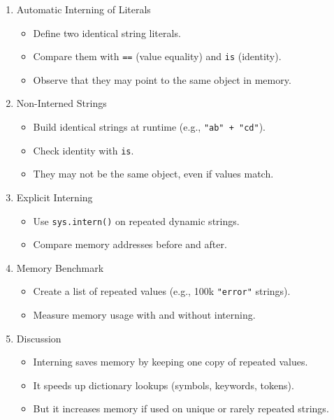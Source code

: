 \documentclass[
  letterpaper,
  DIV=11,
  numbers=noendperiod]{scrreprt}
\providecommand{\tightlist}{%
  \setlength{\itemsep}{0pt}\setlength{\parskip}{0pt}}
\begin{document}
\begin{enumerate}
\def\labelenumi{\arabic{enumi}.}
\item
  Automatic Interning of Literals

  \begin{itemize}
  \tightlist
  \item
    Define two identical string literals.
  \item
    Compare them with \texttt{==} (value equality) and \texttt{is}
    (identity).
  \item
    Observe that they may point to the same object in memory.
  \end{itemize}
\item
  Non-Interned Strings

  \begin{itemize}
  \tightlist
  \item
    Build identical strings at runtime (e.g., \texttt{"ab"\ +\ "cd"}).
  \item
    Check identity with \texttt{is}.
  \item
    They may not be the same object, even if values match.
  \end{itemize}
\item
  Explicit Interning

  \begin{itemize}
  \tightlist
  \item
    Use \texttt{sys.intern()} on repeated dynamic strings.
  \item
    Compare memory addresses before and after.
  \end{itemize}
\item
  Memory Benchmark

  \begin{itemize}
  \tightlist
  \item
    Create a list of repeated values (e.g., 100k \texttt{"error"}
    strings).
  \item
    Measure memory usage with and without interning.
  \end{itemize}
\item
  Discussion

  \begin{itemize}
  \tightlist
  \item
    Interning saves memory by keeping one copy of repeated values.
  \item
    It speeds up dictionary lookups (symbols, keywords, tokens).
  \item
    But it increases memory if used on unique or rarely repeated
    strings.
  \end{itemize}
\end{enumerate}
\end{document}
